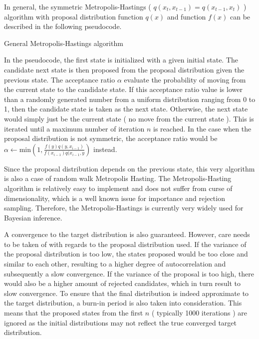 \documentclass{usiinftr}
\begin{document}
In general, the symmetric Metropolis-Hastings ( $q(x_t,x_{t-1}) = q(x_{t-1},x_t)$ ) algorithm with proposal distribution function $q(x)$ and function $f(x)$ can be described in the following pseudocode.

\begin{algorithm}
  \caption{General Metropolis-Hastings algorithm} \label{algMH}
  \begin{algorithmic}[1]
    \Statex
        \Else
        \EndIf
    \EndFor
    \State {}
    \EndFunction
  \end{algorithmic}
\end{algorithm}

In the pseudocode, the first state is initialized with a given initial state. The candidate next state is then proposed from the proposal distribution given the previous state. The acceptance ratio $\alpha$ evaluate the probability of moving from the current state to the candidate state. If this acceptance ratio value is lower than a randomly generated number from a uniform distribution ranging from 0 to 1, then the candidate state is taken as the next state. Otherwise, the next state would simply just be the current state ( no move from the current state ). This is iterated until a maximum number of iteration $n$ is reached. In the case when the proposal distribution is not symmetric, the acceptance ratio would be $ \alpha \gets \textrm{min}\left(1, \frac{f(y)q(y,x_{i-1})}{f(x_{i-1})q(x_{i-1},y}\right)$ instead. 

Since the proposal distribution depends on the previous state, this very algorithm is also a case of random walk Metropolis Hasting. The Metropolis-Hasting algorithm is relatively easy to implement and does not suffer from curse of dimensionality, which is a well known issue for importance and rejection sampling. Therefore, the Metropolis-Hastings is currently very widely used for Bayesian inference. 

A convergence to the target distribution is also guaranteed. However, care needs to be taken of with regards to the proposal distribution used. If the variance of the proposal distribution is too low, the states proposed would be too close and similar to each other, resulting to a higher degree of autocorrelation and subsequently a slow convergence. If the variance of the proposal is too high, there would also be a higher amount of rejected candidates, which in turn result to slow convergence. To ensure that the final distribution is indeed approximate to the target distribution, a burn-in period is also taken into consideration. This means that the proposed states from the first $n$ ( typically 1000 iterations ) are ignored as the initial distributions may not reflect the true converged target distribution.
\end{document}
